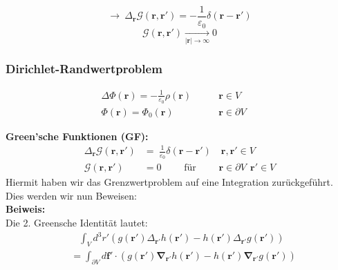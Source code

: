 \documentclass[titlepage,11pt,a4paper,ngerman]{report}
\newcommand{\pofr}{\Phi(\vec{r})}
\renewcommand{\Phi}{\varPhi}
\renewcommand{\vec}[1]{\boldsymbol{#1}}
\newcommand{\lcom}[1]{\color{MidnightBlue}#1\color{black}}
\renewcommand{\epsilon}{\varepsilon}
\begin{document}
$$\rightarrow\ \Delta_{\vec{r}} \mathcal G(\vec{r}, \vec{r}') = - \frac{1}{\epsilon_0} \delta(\vec{r} - \vec{r}')$$
$$\mathcal G(\vec{r}, \vec{r}') \underset{|\vec{r}| \to \infty} \longrightarrow 0 $$

\subsubsection{Dirichlet-Randwertproblem}

\begin{minipage}{.6\linewidth}
	\begin{align*}
	\Delta \pofr = -\frac{1}{\epsilon_0} \rho(\vec{r}) &\qquad \vec{r} \in V\\
	\pofr = \Phi_0 (\vec{r}) \quad \; &\qquad \vec{r} \in \partial V \quad \;
	\end{align*}
\end{minipage}
\begin{minipage}{.4\linewidth}
	\centering
\end{minipage}
\textbf{Green'sche Funktionen (GF):}
\begin{align*}
\Delta_{\vec{r}} \mathcal G(\vec{r}, \vec{r}') &= \ \frac{1}{\epsilon_0} \delta(\vec{r} - \vec{r}') \quad \vec{r},\vec{r}' \in V\\
\mathcal G(\vec{r}, \vec{r}') &= 0 \qquad \textrm{ für } \qquad \vec{r} \in \partial V \ \  \vec{r}' \in V
\end{align*}
\lcom{Hiermit haben wir das Grenzwertproblem auf eine Integration zurückgeführt. Dies werden wir nun Beweisen:}\\[5pt]
\textbf{Beiweis:}\\
Die 2. Greensche Identität lautet: 
\begin{align*}
&\ \ \ \, \int_V d^3 r' \left( g(\vec{r}') \Delta_{\vec{r}'} h(\vec{r}')  - h(\vec{r}') \Delta_{\vec{r}'} g(\vec{r}') \right)\\
&= \int_{\partial V} d\vec{f}' \cdot \left(g(\vec{r}') \vec{\nabla}_{\vec{r}'} h(\vec{r}') - h(\vec{r}') \vec{\nabla} _{\vec{r}'} g(\vec{r}') \right)
\end{align*}
\end{document}
